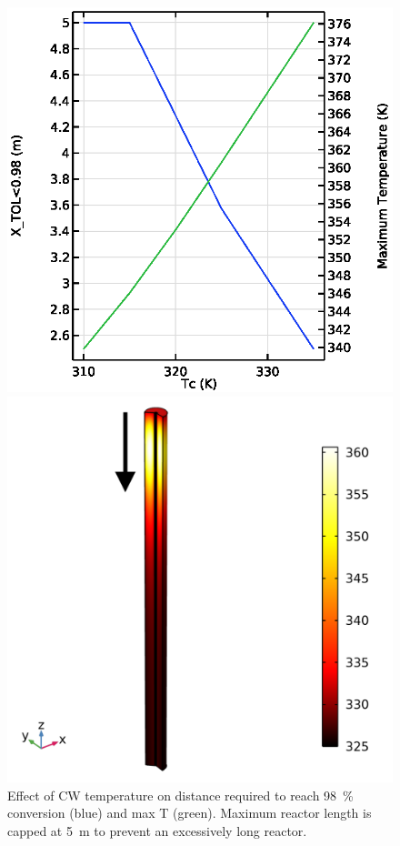 \begin{figure}[h]
    \begin{minipage}[t]{0.42\linewidth}
        \includegraphics[width=\linewidth,scale=0.5]{figures/S4-CW-X-T.eps}
        \caption{Effect of CW temperature on distance required to reach \SI{98}{\percent} conversion (blue) and max T (green). Maximum reactor length is capped at \SI{5}{\m} to prevent an excessively long reactor.}
        \label{fig:comsol-S4-CW-X-T}
    \end{minipage}\hfill
    \begin{minipage}[t]{0.42\linewidth}
        \includegraphics[width=\linewidth,scale=0.5]{chapters/2-reaction/figures/temperature-surface-arrow.png}

\end{minipage}
\end{figure}
